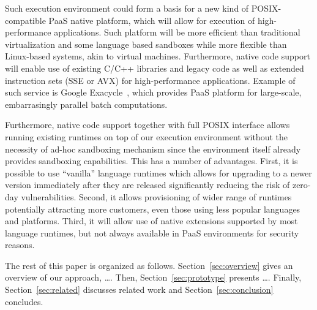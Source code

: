 Such execution environment could form a basis for a new kind of
POSIX-compatible PaaS native platform, which will allow for execution of
high-performance applications. Such platform will be more efficient than
traditional virtualization and some language based sandboxes while more
flexible than Linux-based systems, akin to virtual machines.
Furthermore, native code support will enable use of existing C/C++
libraries and legacy code as well as extended instruction sets (\eg SSE
or AVX) for high-performance applications. Example of such service is
Google Exacycle~\cite{exacycle:google}, which provides PaaS platform for
large-scale, embarrasingly parallel batch computations.

Furthermore, native code support together with full POSIX interface
allows running existing runtimes on top of our execution environment
without the necessity of ad-hoc sandboxing mechanism since the
environment itself already provides sandboxing capabilities. This has a
number of advantages.  First, it is possible to use ``vanilla'' language
runtimes which allows for upgrading to a newer version immediately after
they are released significantly reducing the risk of zero-day
vulnerabilities. Second, it allows provisioning of wider range of
runtimes potentially attracting more customers, even those using less
popular languages and platforms.  Third, it will allow use of native
extensions supported by most language runtimes, but not always available in
PaaS environments for security reasons.




The rest of this paper is organized as follows.
Section~\ref{sec:overview} gives an overview of our approach, \ldots.
Then, Section~\ref{sec:prototype} presents \ldots. Finally,
Section~\ref{sec:related} discusses related work and
Section~\ref{sec:conclusion} concludes.


